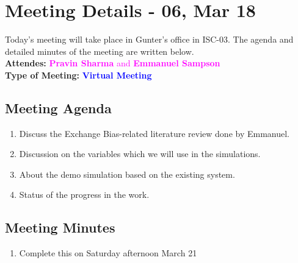 \section{Meeting Details - 06, Mar 18 }
\label{chap:Meeting_06}
Today's meeting will take place in Gunter's office in ISC-03. The agenda and detailed minutes of the meeting are written below.
\\ \textbf{Attendes:}
\textcolor{magenta}{\textbf{Pravin Sharma} and \textbf{Emmanuel Sampson}}
\\ \textbf{Type of Meeting:}
\textcolor{blue}{\textbf{Virtual Meeting} }
\subsection*{Meeting Agenda}
\begin{enumerate}
    \item Discuss the Exchange Bias-related literature review done by Emmanuel.
    \item Discussion on the variables which we will use in the simulations.
    \item About the demo simulation based on the existing system.
    \item Status of the progress in the work.
\end{enumerate}
\subsection*{Meeting Minutes}
\begin{enumerate}
    \item Complete this on Saturday afternoon March 21
\end{enumerate}